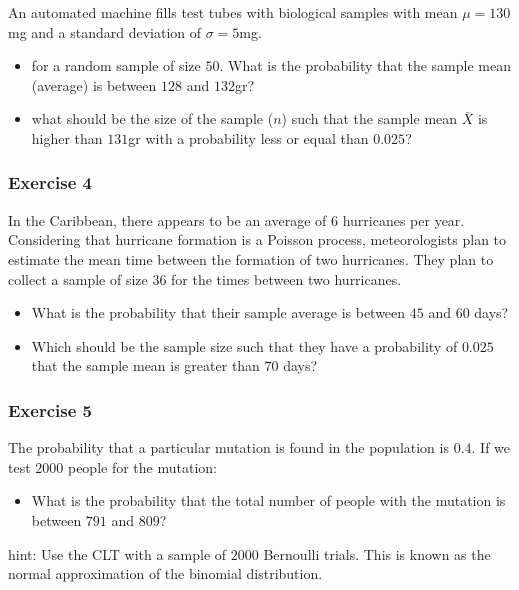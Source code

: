 \documentclass[
]{book}
\providecommand{\tightlist}{%
  \setlength{\itemsep}{0pt}\setlength{\parskip}{0pt}}
\begin{document}
An automated machine fills test tubes with biological samples with mean \(\mu=130\)mg and a standard deviation of \(\sigma=5\)mg.

\begin{itemize}
\item
  for a random sample of size \(50\). What is the probability that
  the sample mean (average) is between \(128\) and \(132\)gr?
\item
  what should be the size of the sample (\(n\)) such that the sample mean \(\bar{X}\) is higher than \(131\)gr with a probability less or equal than \(0.025\)?
\end{itemize}

\hypertarget{exercise-4-3}{%
\subsubsection{Exercise 4}\label{exercise-4-3}}

In the Caribbean, there appears to be an average of \(6\) hurricanes per year. Considering that hurricane formation is a Poisson process, meteorologists plan to estimate the mean time between the formation of two hurricanes. They plan to collect a sample of size \(36\) for the times between two hurricanes.

\begin{itemize}
\item
  What is the probability that their sample average is between \(45\) and \(60\) days?
\item
  Which should be the sample size such that they have a probability of \(0.025\) that the sample mean is greater than \(70\) days?
\end{itemize}

\hypertarget{exercise-5-2}{%
\subsubsection{Exercise 5}\label{exercise-5-2}}

The probability that a particular mutation is found in the population is \(0.4\). If we test \(2000\) people for the mutation:

\begin{itemize}
\tightlist
\item
  What is the probability that the total number of people with the mutation is between \(791\) and \(809\)?
\end{itemize}

hint: Use the CLT with a sample of \(2000\) Bernoulli trials. This is known as the normal approximation of the binomial distribution.
\end{document}
